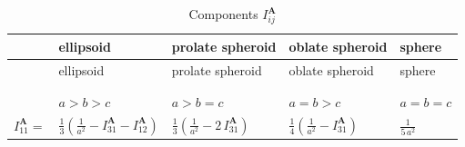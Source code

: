 \documentclass[
  a4paper,
  numbers=noendperiod,
  DIV=12]{scrreprt}
\newcommand{\uu}[1]{{\symbf{{#1}}}}
\begin{document}
\begin{longtable}[]{@{}
  >{\raggedright\arraybackslash}p{}
  >{\raggedright\arraybackslash}p{}
  >{\raggedright\arraybackslash}p{}
  >{\raggedright\arraybackslash}p{}
  >{\raggedright\arraybackslash}p{}@{}}
\toprule\noalign{}
\begin{minipage}[b]{\linewidth}\raggedright
\end{minipage} & \begin{minipage}[b]{\linewidth}\raggedright
ellipsoid
\end{minipage} & \begin{minipage}[b]{\linewidth}\raggedright
prolate spheroid
\end{minipage} & \begin{minipage}[b]{\linewidth}\raggedright
oblate spheroid
\end{minipage} & \begin{minipage}[b]{\linewidth}\raggedright
sphere
\end{minipage} \\
\midrule\noalign{}
\endfirsthead
\toprule\noalign{}
\begin{minipage}[b]{\linewidth}\raggedright
\end{minipage} & \begin{minipage}[b]{\linewidth}\raggedright
ellipsoid
\end{minipage} & \begin{minipage}[b]{\linewidth}\raggedright
prolate spheroid
\end{minipage} & \begin{minipage}[b]{\linewidth}\raggedright
oblate spheroid
\end{minipage} & \begin{minipage}[b]{\linewidth}\raggedright
sphere
\end{minipage} \\
\midrule\noalign{}
\endhead
\bottomrule\noalign{}
\tabularnewline
\caption{Components \(I^{\uu{A}}_{ij}\)}\label{tbl-Iij}\tabularnewline
\endlastfoot
& \(a>b>c\) & \(a>b=c\) & \(a=b>c\) & \(a=b=c\) \\
\(I^{\uu{A}}_{11} =\) &
\(\frac{1}{3}\left(\frac{1}{a^2}-I^{\uu{A}}_{31}-I^{\uu{A}}_{12} \right)\)
& \(\frac{1}{3}\left(\frac{1}{a^2}-2\,I^{\uu{A}}_{31} \right)\) &
\(\frac{1}{4}\left(\frac{1}{a^2}-I^{\uu{A}}_{31} \right)\) &
\(\frac{1}{5\,a^2}\) \\

\end{longtable}
\end{document}
